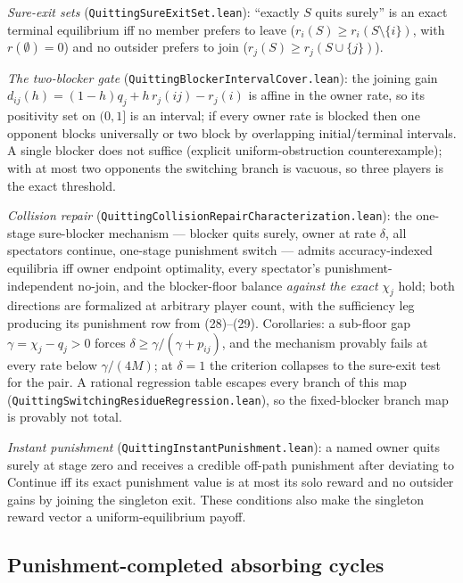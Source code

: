 \documentclass[11pt]{article}
\begin{document}
\emph{Sure-exit sets} (\texttt{QuittingSureExitSet.lean}): ``exactly
\(S\) quits surely'' is an exact terminal equilibrium iff no member prefers
to leave (\(r_i(S)\geq r_i(S\setminus\{i\})\), with \(r(\emptyset)=0\)) and
no outsider prefers to join (\(r_j(S)\geq r_j(S\cup\{j\})\)).

\emph{The two-blocker gate} (\texttt{QuittingBlockerIntervalCover.lean}):
the joining gain \(d_{ij}(h)=(1-h)q_j+h\,r_j(ij)-r_j(i)\) is affine in the
owner rate, so its positivity set on \((0,1]\) is an interval; if every
owner rate is blocked then one opponent blocks universally or two block by
overlapping initial/terminal intervals.  A single blocker does not suffice
(explicit uniform-obstruction counterexample); with at most two opponents
the switching branch is vacuous, so three players is the exact threshold.

\emph{Collision repair}
(\texttt{QuittingCollisionRepairCharacterization.lean}): the one-stage
sure-blocker mechanism --- blocker quits surely, owner at rate
\(\delta\), all spectators continue, one-stage punishment switch --- admits
accuracy-indexed equilibria iff owner endpoint optimality, every
spectator's punishment-independent no-join, and the blocker-floor balance
\emph{against the exact} \(\chi_j\) hold; both directions are formalized at
arbitrary player count, with the sufficiency leg producing its punishment
row from (28)--(29).  Corollaries: a sub-floor gap
\(\gamma=\chi_j-q_j>0\) forces \(\delta\geq\gamma/(\gamma+p_{ij})\), and
the mechanism provably fails at every rate below \(\gamma/(4M)\); at
\(\delta=1\) the criterion collapses to the sure-exit test for the pair.
A rational regression table escapes every branch of this map
(\texttt{QuittingSwitchingResidueRegression.lean}), so the fixed-blocker
branch map is provably not total.

\emph{Instant punishment} (\texttt{QuittingInstantPunishment.lean}): a named
owner quits surely at stage zero and receives a credible off-path punishment
after deviating to Continue iff its exact punishment value is at most its solo
reward and no outsider gains by joining the singleton exit.  These conditions
also make the singleton reward vector a uniform-equilibrium payoff.

\subsection{Punishment-completed absorbing cycles}
\end{document}
